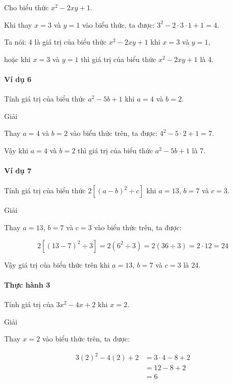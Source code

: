 \documentclass[
]{article}
\begin{document}
Cho biểu thức \(x^2 - 2xy + 1\).

Khi thay \(x = 3\) và \(y = 1\) vào biểu thức, ta được:
\(3^2 - 2 \cdot 3 \cdot 1 + 1 = 4\).

Ta nói: 4 là giá trị của biểu thức \(x^2 - 2xy + 1\) khi \(x = 3\) và
\(y = 1\),

hoặc khi \(x = 3\) và \(y = 1\) thì giá trị của biểu thức
\(x^2 - 2xy + 1\) là 4.

\paragraph{Ví dụ 6}\label{vuxed-dux1ee5-6-1}

Tính giá trị của biểu thức \(a^2 - 5b + 1\) khi \(a = 4\) và \(b = 2\).

Giải

Thay \(a = 4\) và \(b = 2\) vào biểu thức trên, ta được:
\(4^2 - 5 \cdot 2 + 1 = 7\).

Vậy khi \(a = 4\) và \(b = 2\) thì giá trị của biểu thức
\(a^2 - 5b + 1\) là 7.

\paragraph{Ví dụ 7}\label{vuxed-dux1ee5-7}

Tính giá trị của biểu thức \(2[(a - b)^2 \div c]\) khi \(a = 13\),
\(b = 7\) và \(c = 3\).

Giải

Thay \(a = 13\), \(b = 7\) và \(c = 3\) vào biểu thức trên, ta được:

\[ 2[(13 - 7)^2 \div 3] = 2(6^2 \div 3) = 2(36 \div 3) = 2 \cdot 12 = 24 \]

Vậy giá trị của biểu thức trên khi \(a = 13\), \(b = 7\) và \(c = 3\) là
24.

\paragraph{Thực hành 3}\label{thux1ef1c-huxe0nh-3}

Tính giá trị của \(3x^2 - 4x + 2\) khi \(x = 2\).

Giải

Thay \(x = 2\) vào biểu thức trên, ta được:

\begin{align*}
3(2)^2 - 4(2) + 2 &= 3 \cdot 4 - 8 + 2 \\
&= 12 - 8 + 2 \\
&= 6
\end{align*}
\end{document}
